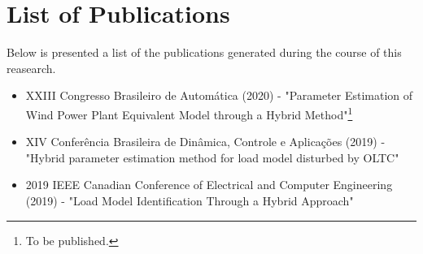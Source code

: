 \chapter{List of Publications}
\label{ch: Publications}

Below is presented a list of the publications generated during the course of this reasearch.

\begin{itemize}
	\item XXIII Congresso Brasileiro de Autom\'atica (2020) - "Parameter Estimation of Wind Power Plant Equivalent Model through a Hybrid Method"\footnote{To be published.}
	\item XIV Conferência Brasileira de Dinâmica, Controle e Aplicações (2019) - "Hybrid parameter estimation method for load model disturbed by OLTC"
	\item 2019 IEEE Canadian Conference of Electrical and Computer Engineering (2019) - "Load Model Identification Through a Hybrid Approach"
\end{itemize}